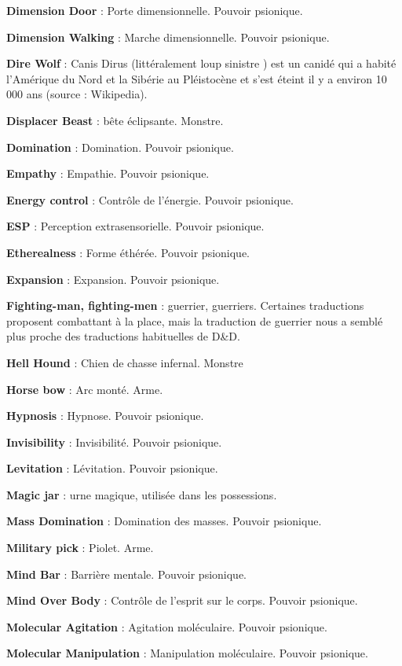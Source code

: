 \documentclass[11pt]{article}
\begin{document}
{{\textbf{Dimension Door} : Porte dimensionnelle. Pouvoir psionique.

\textbf{Dimension Walking} : Marche dimensionnelle. Pouvoir psionique.

\textbf{Dire Wolf} : Canis Dirus (littéralement \og loup sinistre \fg) est un canidé qui a habité l'Amérique du Nord et la Sibérie au Pléistocène et s’est éteint il y a environ 10 000 ans (source : Wikipedia).

\textbf{Displacer Beast} : bête éclipsante. Monstre.

\textbf{Domination} : Domination. Pouvoir psionique.

\textbf{Empathy} : Empathie. Pouvoir psionique.

\textbf{Energy control} : Contrôle de l'énergie. Pouvoir psionique.

\textbf{ESP} : Perception extrasensorielle. Pouvoir psionique.

\textbf{Etherealness} : Forme éthérée. Pouvoir psionique.

\textbf{Expansion} : Expansion. Pouvoir psionique.

\textbf{Fighting-man, fighting-men} : guerrier, guerriers. Certaines traductions proposent \og combattant \fg{} à la place, mais la traduction de guerrier nous a semblé plus proche des traductions habituelles de D\&D.

\textbf{Hell Hound} : Chien de chasse infernal. Monstre

\textbf{Horse bow} : Arc monté. Arme.

\textbf{Hypnosis} : Hypnose. Pouvoir psionique.

\textbf{Invisibility} : Invisibilité. Pouvoir psionique.

\textbf{Levitation} : Lévitation. Pouvoir psionique.

\textbf{Magic jar} : urne magique, utilisée dans les possessions.

\textbf{Mass Domination} : Domination des masses. Pouvoir psionique.

\textbf{Military pick} : Piolet. Arme.

\textbf{Mind Bar} : Barrière mentale. Pouvoir psionique.

\textbf{Mind Over Body} : Contrôle de l'esprit sur le corps. Pouvoir psionique.

\textbf{Molecular Agitation} : Agitation moléculaire. Pouvoir psionique.

\textbf{Molecular Manipulation} : Manipulation moléculaire. Pouvoir psionique.

}}
\end{document}
